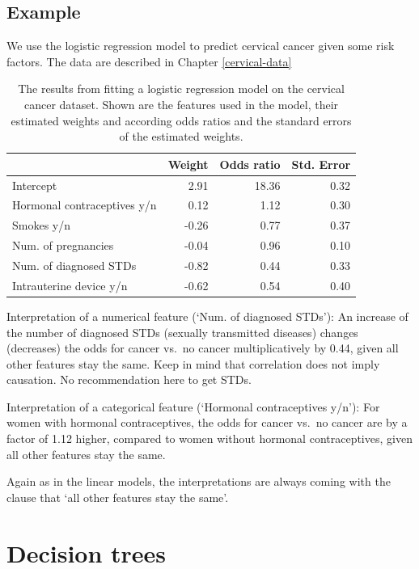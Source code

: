 \documentclass[12pt,]{krantz}
\theoremstyle{definition}
\theoremstyle{definition}
\theoremstyle{definition}
\theoremstyle{remark}
\begin{document}
\subsection{Example}\label{example}

We use the logistic regression model to predict cervical cancer given
some risk factors. The data are described in Chapter \ref{cervical-data}

\begin{table}

\caption{\label{tab:logistic-example}The results from fitting a logistic regression model on the cervical cancer dataset. Shown are the features used in the model, their estimated weights and according odds ratios and the standard errors of the estimated weights.}
\centering
\begin{tabular}[t]{l|r|r|r}
\hline
  & Weight & Odds ratio & Std. Error\\
\hline
Intercept & 2.91 & 18.36 & 0.32\\
\hline
Hormonal contraceptives y/n & 0.12 & 1.12 & 0.30\\
\hline
Smokes y/n & -0.26 & 0.77 & 0.37\\
\hline
Num. of pregnancies & -0.04 & 0.96 & 0.10\\
\hline
Num. of diagnosed STDs & -0.82 & 0.44 & 0.33\\
\hline
Intrauterine device y/n & -0.62 & 0.54 & 0.40\\
\hline
\end{tabular}
\end{table}

Interpretation of a numerical feature (`Num. of diagnosed STDs'): An
increase of the number of diagnosed STDs (sexually transmitted diseases)
changes (decreases) the odds for cancer vs.~no cancer multiplicatively
by 0.44, given all other features stay the same. Keep in mind that
correlation does not imply causation. No recommendation here to get
STDs.

Interpretation of a categorical feature (`Hormonal contraceptives y/n'):
For women with hormonal contraceptives, the odds for cancer vs.~no
cancer are by a factor of 1.12 higher, compared to women without
hormonal contraceptives, given all other features stay the same.

Again as in the linear models, the interpretations are always coming
with the clause that `all other features stay the same'.

\section{Decision trees}\label{decision-trees}
\end{document}
